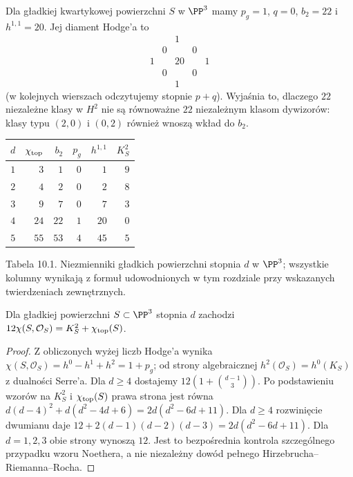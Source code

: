 \begin{przyklad}[Diament K3]
Dla gładkiej kwartykowej powierzchni $S$ w $\PP^3$
mamy $p_g=1$, $q=0$, $b_2=22$ i $h^{1,1}=20$.
Jej diament Hodge'a to
\[
 \begin{array}{ccccc}
 &&1&&\\
 &0&&0&\\
 1&&20&&1\\
 &0&&0&\\
 &&1&&
 \end{array}
\]
(w kolejnych wierszach odczytujemy stopnie $p+q$).
Wyjaśnia to, dlaczego $22$ niezależne klasy w $H^2$
nie są równoważne $22$ niezależnym klasom dywizorów:
klasy typu $(2,0)$ i $(0,2)$ również wnoszą wkład do $b_2$.
\end{przyklad}

\begin{center}
\small
\begin{tabular}{c|r|r|r|r|r}
$d$ & $\chi_{\rm top}$ & $b_2$ & $p_g$ & $h^{1,1}$ & $K_S^2$\\\hline
$1$ & $3$ & $1$ & $0$ & $1$ & $9$\\
$2$ & $4$ & $2$ & $0$ & $2$ & $8$\\
$3$ & $9$ & $7$ & $0$ & $7$ & $3$\\
$4$ & $24$ & $22$ & $1$ & $20$ & $0$\\
$5$ & $55$ & $53$ & $4$ & $45$ & $5$
\end{tabular}

\smallskip
{\small Tabela 10.1. Niezmienniki gładkich powierzchni
stopnia $d$ w $\PP^3$; wszystkie kolumny wynikają
z formuł udowodnionych w tym rozdziale przy wskazanych
twierdzeniach zewnętrznych.}\par
\end{center}

\begin{stwierdzenie}
Dla gładkiej powierzchni $S\subset\PP^3$ stopnia $d$
zachodzi $12\chi(S,\mathcal O_S)=K_S^2+\chi_{\rm top}(S)$.
\end{stwierdzenie}
\begin{proof}
Z obliczonych wyżej liczb Hodge'a wynika
$\chi(S,\mathcal O_S)=h^0-h^1+h^2=1+p_g$;
od strony algebraicznej $h^2(\mathcal O_S)=h^0(K_S)$
z dualności Serre'a. Dla $d\ge4$ dostajemy
$12(1+\binom{d-1}{3})$.
Po podstawieniu wzorów na $K_S^2$ i
$\chi_{\rm top}(S)$ prawa strona jest równa
$d(d-4)^2+d(d^2-4d+6)=2d(d^2-6d+11)$.
Dla $d\ge4$ rozwinięcie dwumianu daje
$12+2(d-1)(d-2)(d-3)=2d(d^2-6d+11)$.
Dla $d=1,2,3$ obie strony wynoszą $12$.
Jest to bezpośrednia kontrola szczególnego przypadku
wzoru Noethera, a nie niezależny dowód pełnego
Hirzebrucha--Riemanna--Rocha.
\end{proof}

